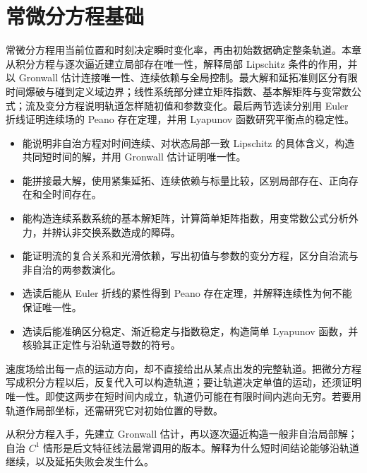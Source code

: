 \chapter{常微分方程基础}
\label{b2:ch:ode}
\begin{chapterabstract}
常微分方程用当前位置和时刻决定瞬时变化率，再由初始数据确定整条轨道。本章从积分方程与逐次逼近建立局部存在唯一性，解释局部 Lipschitz 条件的作用，并以 Gronwall 估计连接唯一性、连续依赖与全局控制。最大解和延拓准则区分有限时间爆破与碰到定义域边界；线性系统部分建立矩阵指数、基本解矩阵与变常数公式；流及变分方程说明轨道怎样随初值和参数变化。最后两节选读分别用 Euler 折线证明连续场的 Peano 存在定理，并用 Lyapunov 函数研究平衡点的稳定性。
\end{chapterabstract}

\begin{learninggoals}
\begin{itemize}
\item\label{b2:item:ode-goal-local}能说明非自治方程对时间连续、对状态局部一致 Lipschitz 的具体含义，构造共同短时间的解，并用 Gronwall 估计证明唯一性。
\item\label{b2:item:ode-goal-continuation}能拼接最大解，使用紧集延拓、连续依赖与标量比较，区别局部存在、正向存在和全时间存在。
\item\label{b2:item:ode-goal-linear}能构造连续系数系统的基本解矩阵，计算简单矩阵指数，用变常数公式分析外力，并辨认非交换系数造成的障碍。
\item\label{b2:item:ode-goal-flow}能证明流的复合关系和光滑依赖，写出初值与参数的变分方程，区分自治流与非自治的两参数演化。
\item\label{b2:item:ode-goal-peano}选读后能从 Euler 折线的紧性得到 Peano 存在定理，并解释连续性为何不能保证唯一性。
\item\label{b2:item:ode-goal-stability}选读后能准确区分稳定、渐近稳定与指数稳定，构造简单 Lyapunov 函数，并核验其正定性与沿轨道导数的符号。
\end{itemize}
\end{learninggoals}

速度场给出每一点的运动方向，却不直接给出从某点出发的完整轨道。把微分方程写成积分方程以后，反复代入可以构造轨道；要让轨道决定单值的运动，还须证明唯一性。即使这两步在短时间内成立，轨道仍可能在有限时间内逃向无穷。若要用轨道作局部坐标，还需研究它对初始位置的导数。

\ProseParagraphBreak

从积分方程入手，先建立 Gronwall 估计，再以逐次逼近构造一般非自治局部解；自治 \(C^1\) 情形是后文特征线法最常调用的版本。解释为什么短时间结论能够沿轨道继续，以及延拓失败会发生什么。

